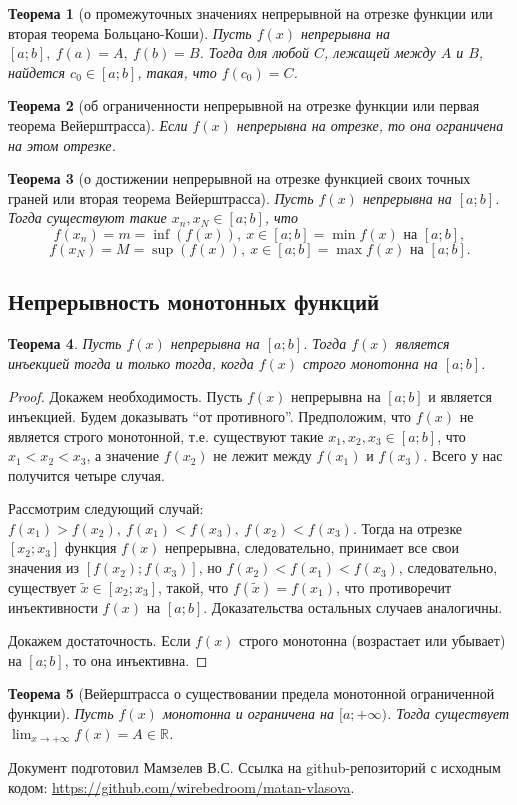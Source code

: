 \documentclass[a4paper,12pt]{article} %
\newtheorem{theorem}{Теорема}[section]
\theoremstyle{remark}
\theoremstyle{definition}
\begin{document}
\begin{theorem}[о промежуточных значениях непрерывной на отрезке функции или вторая теорема Больцано-Коши]
    Пусть $f(x)$ непрерывна на $[a; b], \ f(a) = A, \ f(b) = B$. Тогда для любой $C$, лежащей между $A$ и $B$, найдется $c_0 \in [a; b]$, такая, что $f(c_0) = C$.
\end{theorem}

\begin{theorem}[об ограниченности непрерывной на отрезке функции или первая теорема Вейерштрасса]
    Если $f(x)$ непрерывна на отрезке, то она ограничена на этом отрезке. 
\end{theorem}

\begin{theorem}[о достижении непрерывной на отрезке функцией своих точных граней или вторая теорема Вейерштрасса]
    Пусть $f(x)$ непрерывна на $[a; b]$. Тогда существуют такие $x_{n}, x_N \in [a; b]$, что
    \[ f(x_{n}) = m = \inf(f(x)), \ x\in [a; b] = \min f(x) \text{ на } [a; b] ,\] 
    \[ f(x_{N}) = M = \sup(f(x)), \ x\in [a; b] = \max f(x) \text{ на } [a; b] .\] 
\end{theorem}

\subsection{Непрерывность монотонных функций}
\begin{theorem}
    Пусть $f(x)$ непрерывна на $[a; b]$. Тогда $f(x)$ является инъекцией тогда и только тогда, когда $f(x)$ строго монотонна на $[a; b]$.
\end{theorem}
\begin{proof}
    Докажем необходимость. Пусть $f(x)$ непрерывна на $[a; b]$ и является инъекцией. Будем доказывать ``от противного''. Предположим, что $f(x)$ не является строго монотонной, т.е. существуют такие $x_1, x_2, x_3 \in [a; b]$, что $x_1 < x_2 < x_3$, а значение $f(x_2)$ не лежит между $f(x_1)$ и $f(x_3)$. Всего у нас получится четыре случая.

    Рассмотрим следующий случай: $f(x_1) > f(x_2), \ f(x_1) < f(x_3), \ f(x_2) < f(x_3)$. Тогда на отрезке $[x_2; x_3]$ функция $f(x)$ непрерывна, следовательно, принимает все свои значения из $[f(x_2); f(x_3)]$, но $f(x_2) < f(x_1) < f(x_3)$, следовательно, существует $\widetilde{x} \in [x_2; x_3]$, такой, что $f(\widetilde{x}) = f(x_1)$, что противоречит инъективности $f(x)$ на $[a; b]$. Доказательства остальных случаев аналогичны.

    Докажем достаточность. Если $f(x)$ строго монотонна (возрастает или убывает) на $[a; b]$, то она инъективна.
\end{proof}

\begin{theorem}[Вейерштрасса о существовании предела монотонной ограниченной функции]
    Пусть $f(x)$ монотонна и ограничена на $[a; +\infty)$. Тогда существует $\displaystyle \lim_{x \to +\infty} f(x) = A \in \mathbb{R}$.
\end{theorem}



\newpage
Документ подготовил Мамзелев В.С.
Ссылка на github-репозиторий с исходным кодом: \url{https://github.com/wirebedroom/matan-vlasova}.
\end{document}
